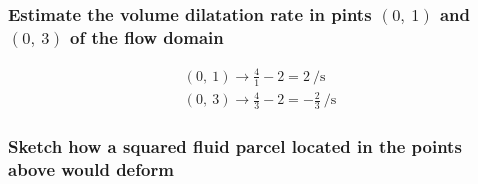 \documentclass[class=report, crop=false, 12pt,a4paper]{standalone}
\begin{document}
\subsubsection{Estimate the volume dilatation rate in pints $(0, \ 1)$ and $(0, \ 3)$ of the flow domain}
\begin{gather}
  (0, \ 1) \rightarrow \frac{4}{1} - 2 = 2 \ \si{\per\second}\\
  (0, \ 3) \rightarrow \frac{4}{3} - 2 = -\frac{2}{3} \ \si{\per\second}
\end{gather}
\subsubsection{Sketch how a squared fluid parcel located in the points above would deform}
\end{document}
